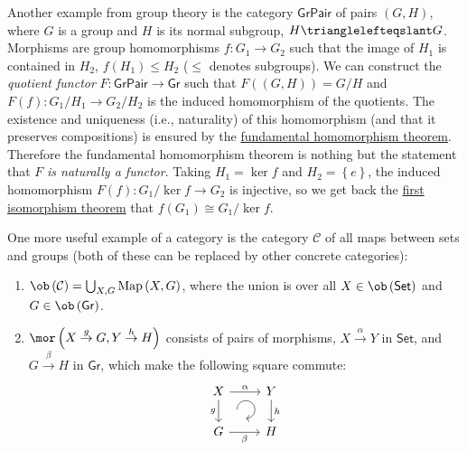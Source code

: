 \begin{example}
    \label{quotient functor}Another example from group theory is
    the category $\mathsf{GrPair}$ of pairs $\left(G,H\right)$, where
    $G$ is a group and $H$ is its normal subgroup, $H\trianglelefteqslant G$.
    Morphisms are group homomorphisms $f:G_{1}\to G_{2}$ such that the
    image of $H_{1}$ is contained in $H_{2}$, $f\left(H_{1}\right)\leq H_{2}$
    ($\leq$ denotes subgroups). We can construct the \emph{quotient functor} $F:\mathsf{GrPair}\to\mathsf{Gr}$
    such that $F\left(\left(G,H\right)\right)=G/H$ and $F\left(f\right):G_{1}/H_{1}\to G_{2}/H_{2}$
    is the induced homomorphism of the quotients. The existence and uniqueness
    (i.e., naturality) of this homomorphism (and that it preserves compositions)
    is ensured by the \href{https://en.wikipedia.org/wiki/Fundamental_theorem_on_homomorphisms}{fundamental homomorphism theorem}.
    Therefore the fundamental homomorphism theorem is nothing but the
    statement that $F$\emph{ is naturally a functor}. Taking $H_{1}=\ker f$ and $H_{2}=\left\{ e\right\} $, the induced homomorphism $F(f):G_{1}/\ker f\to G_{2}$
    is injective, so we get back the \href{https://en.wikipedia.org/wiki/Isomorphism_theorems\#First_isomorphism_theorem}{first isomorphism theorem}
    that $f\left(G_{1}\right)\cong G_{1}/\ker f$.
\end{example}
%
\begin{example}
    One more useful example of a category is the category $\mathcal{C}$
    of all maps between sets and groups (both of these can be replaced
    by other concrete categories):
    \begin{enumerate}
        \item $\ob\left(\mathcal{C}\right)=\bigcup_{X,G}\mathrm{Map}\left(X,G\right)$,
        where the union is over all $X\in\ob\left(\mathsf{Set}\right)$ and
        $G\in\ob\left(\mathsf{Gr}\right)$.
        \item $\mor\left(X\overset{g}{\to}G,Y\overset{h}{\to}H\right)$ consists
        of pairs of morphisms, $X\overset{\alpha}{\to}Y$ in $\mathsf{Set}$,
        and $G\overset{\beta}{\to}H$ in $\mathsf{Gr}$, which make the following
        square commute: \[\begin{tikzcd}[every matrix/.append style={name=m},   
        execute at end picture={\draw [<-] ([xshift=-2em,yshift=1mm]m-2-2.north) arc[start angle=-90,delta angle=270,radius=0.25cm];}]
        X \arrow[r,"\alpha"]\arrow[d,swap,"g"]& Y\arrow[d,"h"] \\
        G\arrow[r,swap,"\beta"]& H
        \end{tikzcd}\]
    \end{enumerate}
\end{example}

